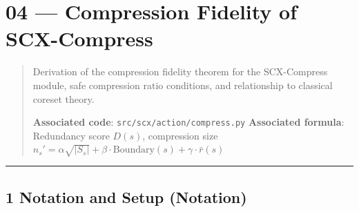 \documentclass[
  12pt,
]{article}
\author{SCX}
\date{2026}
\begin{document}
\section{04 --- Compression Fidelity of SCX-Compress}\label{compression-fidelity-of-scx-compress}

\begin{quote}
Derivation of the compression fidelity theorem for the SCX-Compress module, safe compression ratio conditions, and relationship to classical coreset theory.

\textbf{Associated code}: \texttt{src/scx/action/compress.py}
\textbf{Associated formula}: Redundancy score \(D(s)\), compression size
\(n_s' = \alpha\sqrt{|S_s|} + \beta\cdot\text{Boundary}(s) + \gamma\cdot\bar{r}(s)\)
\end{quote}

\begin{center}\rule{0.5\linewidth}{0.5pt}\end{center}

\subsection{1 Notation and Setup (Notation)}\label{notation-and-setup}
\end{document}
